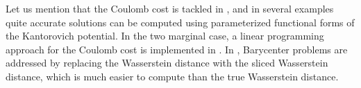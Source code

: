 \documentclass[letter,10pt]{article}
\theoremstyle{dotless}
\begin{document}
Let us mention that the Coulomb cost is tackled in \cite{ML}, and in several examples quite accurate solutions can be computed using parameterized functional forms of the Kantorovich potential. In the two marginal case, a linear programming approach for the Coulomb cost is implemented in \cite{cfm}. In \cite{bdpr}, Barycenter problems are addressed by replacing the  Wasserstein distance with the sliced Wasserstein distance, which is much easier to compute than the true Wasserstein distance.


\end{document}
